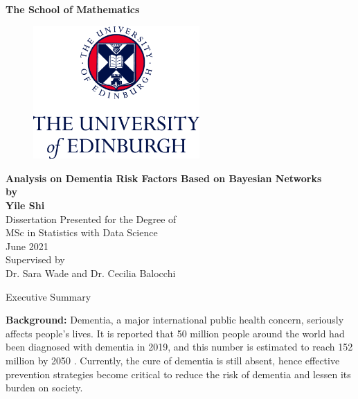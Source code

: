 \documentclass[11pt,twoside]{article}
\numberwithin{Theorem}{section}
\numberwithin{Definition}{section}
\numberwithin{Lemma}{section}
\numberwithin{Algorithm}{section}
\numberwithin{equation}{section}
\begin{document}
	
\pagestyle{empty}

\begin{titlepage}
\vspace*{.5em}
\centering
\textbf{\Large{The School of Mathematics}} \\
\vspace*{1em}
\begin{figure}[!h]
\centering
\includegraphics[width=180pt]{CentredLogoCMYK.jpg}
\end{figure}
\vspace{2em}
\textbf{\Huge{Analysis on Dementia Risk Factors Based on Bayesian Networks}}\\[2em]
\textbf{\LARGE{by}}\\
\vspace{2em}
\textbf{\LARGE{Yile Shi}}\\
\vspace{6.5em}
\Large{Dissertation Presented for the Degree of\\
MSc in Statistics with Data Science}\\
\vspace{6.5em}
\Large{June 2021}\\
\vspace{3em}
\Large{Supervised by\\Dr. Sara Wade and Dr. Cecilia Balocchi}
\vfill
\end{titlepage}

\clearpage

\begin{center}
\Large{Executive Summary}
\end{center}

\textbf{Background:} Dementia, a major international public health concern, seriously affects people's lives. It is reported that 50 million people around the world had been diagnosed with dementia in 2019, and this number is estimated to reach 152 million by 2050 \cite{alzheimer2019world}. Currently, the cure of dementia is still absent, hence effective prevention strategies become critical to reduce the risk of dementia and lessen its burden on society. 
\end{document}

